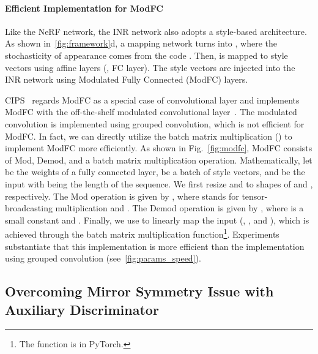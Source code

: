 \documentclass[10pt,twocolumn,letterpaper]{article}
\begin{document}
\paragraph{Efficient Implementation for ModFC}
Like the NeRF network, the INR network also adopts a style-based architecture. As shown in~\cref{fig:framework}d, a mapping network  turns  into , where the stochasticity of appearance comes from the code . Then,  is mapped to style vectors using affine layers (\ie, FC layer). The style vectors are injected into the INR network using Modulated Fully Connected (ModFC) layers.

CIPS~\cite{anokhin2021Image} regards ModFC as a special case of  convolutional layer and implements ModFC with the off-the-shelf modulated convolutional layer~\cite{karras2019Analyzing}. The modulated convolution is implemented using grouped convolution, which is not efficient for ModFC. In fact, we can directly utilize the batch matrix multiplication () to implement ModFC more efficiently. As shown in Fig.~\ref{fig:modfc}, ModFC consists of \textsf{Mod}, \textsf{Demod}, and a batch matrix multiplication operation. Mathematically, let  be the weights of a fully connected layer,  be a batch of style vectors, and  be the input with  being the length of the sequence. We first resize  and  to shapes of  and , respectively. The \textsf{Mod} operation is given by , where  stands for tensor-broadcasting multiplication and . The \textsf{Demod} operation is given by , where  is a small constant and . Finally, we use  to linearly map the input  (\ie, , and ), which is achieved through the batch matrix multiplication function\footnote{The function is  in PyTorch.}. Experiments substantiate that this implementation is more efficient than the implementation using grouped convolution (see~\cref{fig:params_speed}).



\subsection{Overcoming Mirror Symmetry Issue with Auxiliary Discriminator}
\label{sec:mirror_symmetry}
\end{document}
